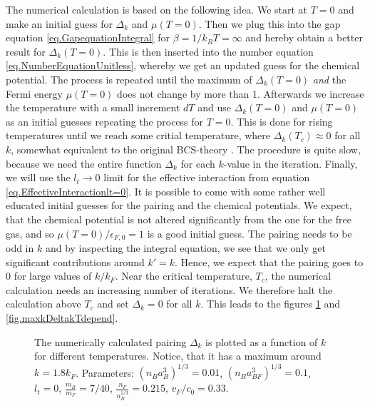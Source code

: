 The numerical calculation is based on the following idea. We start at $T = 0$ and make an initial guess for $\Delta_k$ and $\mu(T=0)$. Then we plug this into the gap equation \eqref{eq.GapequationIntegral} for $\beta = 1/k_BT = \infty$ and hereby obtain a better result for $\Delta_k(T=0)$. This is then inserted into the number equation \eqref{eq.NumberEquationUnitless}, whereby we get an updated guess for the chemical potential. The process is repeated until the maximum of $\Delta_k(T=0)$ \textit{and} the Fermi energy $\mu( T=0 )$ does not change by more than $1$\textperthousand. Afterwards we increase the temperature with a small increment $dT$ and use $\Delta_k(T=0)$ and $\mu( T=0 )$ as an initial guesses repeating the process for $T=0$. This is done for rising temperatures until we reach some critial temperature, where $\Delta_k(T_c)\approx 0$ for all $k$, somewhat equivalent to the original BCS-theory \cite[chapter 3]{Tinkham}. The procedure is quite slow, because we need the entire function $\Delta_k$ for each $k$-value in the iteration. Finally, we will use the $l_t \to 0$ limit for the effective interaction from equation \eqref{eq.EffectiveInteractionlt=0}. It is possible to come with some rather well educated initial guesses for the pairing and the chemical potentials. We expect, that the chemical potential is not altered significantly from the one for the free gas, and so $\mu(T = 0)/\epsilon_{F,0} = 1$ is a good initial guess. The pairing needs to be odd in $k$ and by inspecting the integral equation, we see that we only get significant contributions around $k' = k$. Hence, we expect that the pairing goes to 0 for large values of $k/k_F$. Near the critical temperature, $T_c$, the numerical calculation needs an increasing number of iterations. We therefore halt the calculation above $T_c$ and set $\Delta_k = 0$ for all $k$. This leads to the figures \ref{fig.Deltakkdepend} and \ref{fig.maxkDeltakTdepend}. 

\begin{figure} 
\begin{center}  
  
\caption{The numerically calculated pairing $\Delta_k$ is plotted as a function of $k$ for different temperatures. Notice, that it has a maximum around $k = 1.8 k_F$. Parameters: $(n_Ba_B^3)^{1/3} = 0.01$, $(n_Ba_{BF}^3)^{1/3} = 0.1$, $l_t = 0$, $\frac{m_B}{m_F} = 7/40$, $\frac{n_F}{n_B^{1/3}} = 0.215$, $v_F/c_0 = 0.33$. }  
\label{fig.Deltakkdepend}  
\end{center}    
\end{figure}

